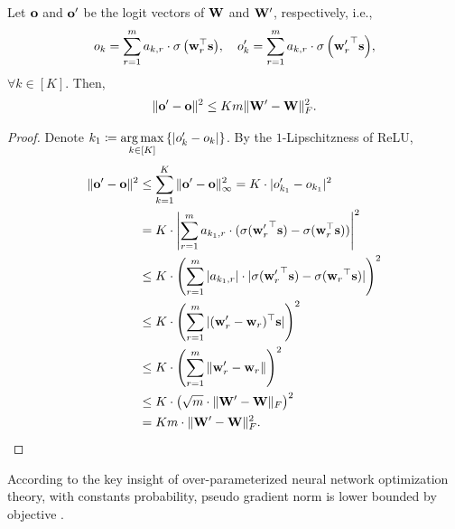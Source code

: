 \begin{lem}
\label{lem:logit_upper_bound_parameter}
Let ${\mathbf{o}}$ and ${\mathbf{o}}^\prime$ be the logit vectors of  ${\mathbf{W}}$ and ${\mathbf{W}}^\prime$, respectively, i.e.,
\begin{equation*}
\begin{split}
    o_{k} = \sum\limits_{r=1}^{m}{ a_{k,r} \cdot \sigma\left({\mathbf{w}}_r^\top {\mathbf{s}} \right)}, \quad o_{k}^\prime = \sum\limits_{r=1}^{m}{ a_{k,r} \cdot \sigma\left({{\mathbf{w}}_r^\prime}^\top {\mathbf{s}} \right)},
\end{split}
\end{equation*}
$\forall k \in [K]$. Then,
\begin{equation*}
\begin{split}
    \| {\mathbf{o}}^\prime - {\mathbf{o}} \|^2 \le K m \| {\mathbf{W}}^\prime - {\mathbf{W}} \|_F^2.
\end{split}
\end{equation*}
\end{lem}
\begin{proof}
Denote $k_1 \coloneqq \operatorname*{arg\,max}\limits_{k \in [K]}\left\{ \left| o_{k}^\prime - o_{k} \right| \right\}$. By the $1$-Lipschitzness of ReLU,
\begin{equation*}
\begin{split}
    \| {\mathbf{o}}^\prime - {\mathbf{o}} \|^2 &\le \sum\limits_{k = 1}^{K}{ \| {\mathbf{o}}^\prime - {\mathbf{o}} \|_\infty^2} = K \cdot | o_{k_1}^\prime - o_{k_1} |^2 \\
    &= K \cdot \left| \sum\limits_{r=1}^{m}{ a_{k_1,r} \cdot ( \sigma({{\mathbf{w}}_r^\prime}^\top {\mathbf{s}} ) - \sigma({\mathbf{w}}_r^\top {\mathbf{s}} ) )} \right|^2 \\
    &\le K \cdot \left( \sum\limits_{r=1}^{m}{ | a_{k_1,r} | \cdot | \sigma({{\mathbf{w}}_r^\prime}^\top {\mathbf{s}}) - \sigma({{\mathbf{w}}_r}^\top {\mathbf{s}}) |  } \right)^2 \\
    &\le K \cdot \left( \sum\limits_{r=1}^{m}{ | ({{\mathbf{w}}_r^\prime} - {\mathbf{w}}_r )^\top {\mathbf{s}} |  } \right)^2 \\
    &\le K \cdot \left( \sum\limits_{r=1}^{m}{ \| {{\mathbf{w}}_r^\prime} - {\mathbf{w}}_r \|  } \right)^2 \\
    &\le K \cdot \left( \sqrt{m} \cdot \| {\mathbf{W}}^\prime - {\mathbf{W}} \|_F \right)^2 \\
    &= K m \cdot \| {\mathbf{W}}^\prime - {\mathbf{W}} \|_F^2. \qedhere
\end{split}
\end{equation*}
\end{proof}

According to the key insight of over-parameterized neural network optimization theory, with constants probability, pseudo gradient norm is lower bounded by objective \citep{li2018learning}.

